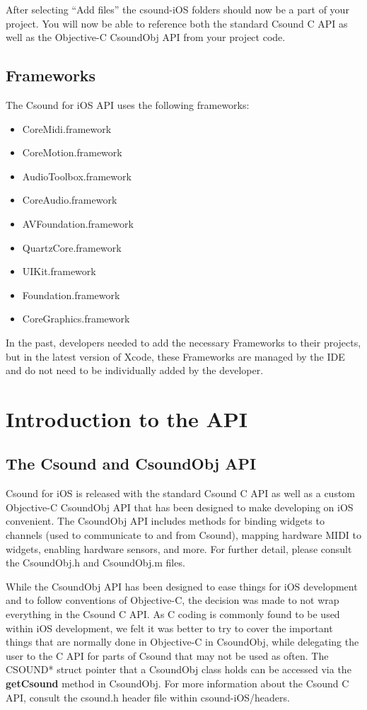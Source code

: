 \documentclass[11pt]{article}
\begin{document}
After selecting ``Add files'' the csound-iOS folders should now be a part of your project.  You will now be able to reference both the standard Csound C API as well as the Objective-C CsoundObj API from your project code.

\subsection{Frameworks}

The Csound for iOS API uses the following frameworks:

\begin{itemize}
  \item CoreMidi.framework
  \item CoreMotion.framework
  \item AudioToolbox.framework
  \item CoreAudio.framework
  \item AVFoundation.framework
  \item QuartzCore.framework
  \item UIKit.framework
  \item Foundation.framework
  \item CoreGraphics.framework
\end{itemize}

In the past, developers needed to add the necessary Frameworks to their projects, but in the latest version of Xcode, these Frameworks are managed by the IDE and do not need to be individually added by the developer.


\section{Introduction to the API}
\subsection{The Csound and CsoundObj API}

Csound for iOS is released with the standard Csound C API as well as a custom Objective-C CsoundObj API that has been designed to make developing on iOS convenient.  The CsoundObj API includes methods for binding widgets to channels (used to communicate to and from Csound), mapping hardware MIDI to widgets, enabling hardware sensors, and more.  For further detail, please consult the CsoundObj.h and CsoundObj.m files.

While the CsoundObj API has been designed to ease things for iOS development and to follow conventions of Objective-C, the decision was made to not wrap everything in the Csound C API.  As C coding is commonly found to be used within iOS development, we felt it was better to try to cover the important things that are normally done in Objective-C in CsoundObj, while delegating the user to the C API for parts of Csound that may not be used as often.  The CSOUND* struct pointer that a CsoundObj class holds can be accessed via the \textbf{getCsound} method in CsoundObj.  For more information about the Csound C API, consult the csound.h header file within csound-iOS/headers.
\end{document}
